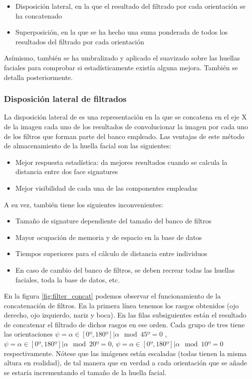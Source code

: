 \begin{itemize}
	\item{Disposición lateral, en la que el resultado del filtrado por cada orientación se ha concatenado}
	\item{Superposición, en la que se ha hecho una suma ponderada de todos los resultados del filtrado por cada orientación}
\end{itemize}

Asímismo, también se ha umbralizado y aplicado el suavizado sobre las huellas faciales para comprobar si estadísticamente existía alguna mejora. También se detalla posteriormente.

\subsubsection{Disposición lateral de filtrados}
La disposición lateral de es una representación en la que se concatena en el eje X de la imagen cada uno de los resultados de convolucionar la imagen por cada uno de los filtros que forman parte del banco empleado. Las ventajas de este método de almacenamiento de la huella facial son las siguientes:
\begin{itemize}
	\item{Mejor respuesta estadística: da mejores resultados cuando se calcula la distancia entre dos face signatures}
	\item{Mejor visibilidad de cada una de las componentes empleadas}
\end{itemize}
A su vez, también tiene los siguientes inconvenientes:
\begin{itemize}
	\item{Tamaño de signature dependiente del tamaño del banco de filtros}
	\item{Mayor ocupación de memoria y de espacio en la base de datos}
	\item{Tiempos superiores para el cálculo de distancia entre individuos}
	\item{En caso de cambio del banco de filtros, se deben recrear todas las huellas faciales, toda la base de datos, etc.}
\end{itemize}
En la figura \ref{fig:filter_concat} podemos observar el funcionamiento de la concatenación de filtros. En la primera línea tenemos los rasgos obtenidos (ojo derecho, ojo izquierdo, nariz y boca). En las filas subsiguientes están el resultado de concatenar el filtrado de dichos rasgos en ese orden. Cada grupo de tres tiene las orientaciones $\psi = \alpha \in \left[0º,180º\right] | \alpha \mod{45º}=0$ ,  $\psi = \alpha \in \left[0º,180º\right] | \alpha \mod{20º}=0$,  $\psi = \alpha \in \left[0º,180º\right] | \alpha \mod{10º}=0$ respectivamente. Nótese que las imágenes están escaladas (todas tienen la misma altura en realidad), de tal manera que en verdad a cada orientación que se añade se estaría incrementando el tamaño de la huella facial.

